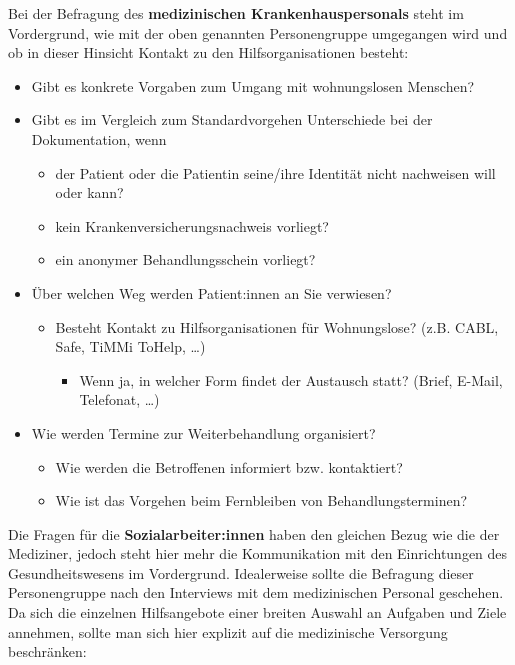 Bei der Befragung des \textbf{medizinischen Krankenhauspersonals} steht im Vordergrund, wie mit der oben genannten Personengruppe umgegangen wird und ob in dieser Hinsicht Kontakt zu den Hilfsorganisationen besteht:

\begin{itemize}
	\item Gibt es konkrete Vorgaben zum Umgang mit wohnungslosen Menschen?
	\item Gibt es im Vergleich zum Standardvorgehen Unterschiede bei der Dokumentation, wenn
	\begin{itemize}
		\item der Patient oder die Patientin seine/ihre Identität nicht nachweisen will oder kann?
		\item kein Krankenversicherungsnachweis vorliegt?
		\item ein anonymer Behandlungsschein vorliegt?
	\end{itemize}
	\item Über welchen Weg werden Patient:innen an Sie verwiesen?
	\begin{itemize}
		\item Besteht Kontakt zu Hilfsorganisationen für Wohnungslose? (z.B. CABL, Safe, TiMMi ToHelp, …)
		\begin{itemize}
			\item Wenn ja, in welcher Form findet der Austausch statt? (Brief, E-Mail, Telefonat, …)
		\end{itemize}
	\end{itemize}
	\item Wie werden Termine zur Weiterbehandlung organisiert?
	\begin{itemize}
		\item Wie werden die Betroffenen informiert bzw. kontaktiert?
		\item Wie ist das Vorgehen beim Fernbleiben von Behandlungsterminen?
	\end{itemize}
\end{itemize}

Die Fragen für die \textbf{Sozialarbeiter:innen} haben den gleichen Bezug wie die der Mediziner, jedoch steht hier mehr die Kommunikation mit den Einrichtungen des Gesundheitswesens im Vordergrund. Idealerweise sollte die Befragung dieser Personengruppe nach den Interviews mit dem medizinischen Personal geschehen. Da sich die einzelnen Hilfsangebote einer breiten Auswahl an Aufgaben und Ziele annehmen, sollte man sich hier explizit auf die medizinische Versorgung beschränken:

